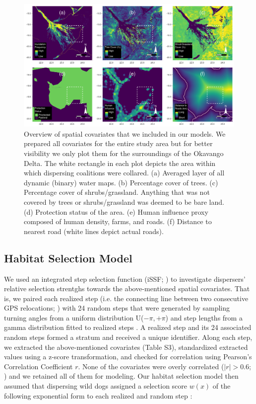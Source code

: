 \documentclass[abstract=on,10pt,a4paper,bibliography=totocnumbered]{article}
\begin{document}
\begin{figure}[h]
  \begin{center}
    \includegraphics[width = \textwidth]{99_Covariates.pdf}
    \caption{Overview of spatial covariates that we included in our models. We
    prepared all covariates for the entire study area but for better visibility
    we only plot them for the surroundings of the Okavango Delta. The white
    rectangle in each plot depicts the area within which dispersing coalitions
    were collared. (a) Averaged layer of all dynamic (binary) water maps. (b)
    Percentage cover of trees. (c) Percentage cover of shrubs/grassland.
    Anything that was not covered by trees or shrubs/grassland was deemed to be
    bare land. (d) Protection status of the area. (e) Human influence proxy
    composed of human density, farms, and roads. (f) Distance to nearest road
    (white lines depict actual roads).}
    \label{Covariates}
  \end{center}
\end{figure}

\subsection{Habitat Selection Model}
We used an integrated step selection function (iSSF; \citealp{Avgar.2016}) to
investigate dispersers' relative selection strentghs towards  the
above-mentioned spatial covariates. That is, we paired each realized step (i.e.
the connecting line between two consecutive GPS relocations;
\citealp{Turchin.1998}) with 24 random steps that were generated by sampling
turning angles from a uniform distribution U(\(-\pi, +\pi\)) and step lengths
from a gamma distribution fitted to realized steps \citep{Avgar.2016}. A
realized step and its 24 associated random steps formed a stratum and received a
unique identifier. Along each step, we extracted the above-mentioned covariates
(Table S3), standardized extracted values using a z-score transformation, and
checked for correlation using Pearson's Correlation Coefficient \(r\). None of
the covariates were overly correlated (\(|r| > 0.6\); \citealp{Latham.2011}) and
we retained all of them for modeling. Our habitat selection model then assumed
that dispersing wild dogs assigned a selection score \(w(x)\) of the following
exponential form to each realized and random step \citep{Fortin.2005}:
\end{document}
